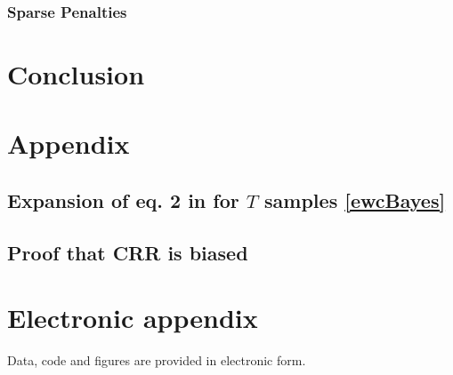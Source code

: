 \documentclass[12pt]{article}
\begin{document}
	\subsubsection{Sparse Penalties}
	\label{reg012}
	
	\section{Conclusion}
	\label{conclusion}
	
	
	\newpage
	
	
	
	\setcounter{page}{5} %
	
	\appendix
	
	\section{Appendix}
	\label{app}
	\subsection{Expansion of eq. 2 in \cite{JK} for $T$ samples \eqref{ewcBayes}}
	\label{ewcB}
	
	\subsection{Proof that CRR is biased}
	\label{crr}
	
		
	\newpage
	
	\section{Electronic appendix}
	\label{el_app}
	
	Data, code and figures are provided in electronic form.
	
	\newpage
	
	
	\RaggedRight
	
	
	\newpage
	
\end{document}
